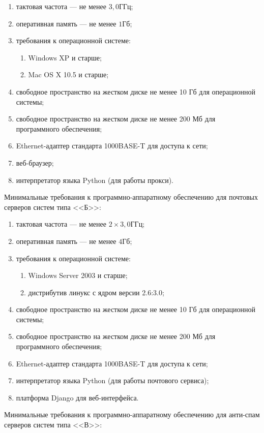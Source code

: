 \begin{enumerate}
	\item тактовая частота  --- не менее $3,0 ГГц$; 
	\item оперативная память --- не менее $1 Гб$;
	\item требования к операционной системе:
	\begin{enumerate}
		\item Windows XP и старше;
		\item Mac OS X 10.5 и старше;
	\end{enumerate}
	\item свободное пространство на жестком диске не менее 10 Гб для операционной системы;
	\item свободное пространство на жестком диске не менее 200 Мб для программного обеспечения;
	\item Ethernet-адаптер стандарта 1000BASE-T для доступа к сети;
	\item веб-браузер;
	\item интерпретатор языка Python (для работы прокси).
\end{enumerate}

Минимальные требования к программно-аппаратному обеспечению для почтовых серверов систем типа <<Б>>:

\begin{enumerate}
	\item тактовая частота  --- не менее $2\times3,0 ГГц$; 
	\item оперативная память --- не менее $4 Гб$;
	\item требования к операционной системе:
	\begin{enumerate}
		\item Windows Server 2003 и старше;
		\item дистрибутив линукс с ядром версии 2.6:3.0;
	\end{enumerate}
	\item свободное пространство на жестком диске не менее 10 Гб для операционной системы;
	\item свободное пространство на жестком диске не менее 200 Мб для программного обеспечения;
	\item Ethernet-адаптер стандарта 1000BASE-T для доступа к сети;
	\item интерпретатор языка Python (для работы почтового сервиса);
	\item платформа Django для веб-интерфейса.
\end{enumerate}

Минимальные требования к программно-аппаратному обеспечению для анти-спам серверов систем типа <<В>>:

